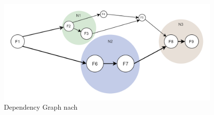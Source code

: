 \documentclass[11pt]{article}
\begin{document}
\begin{figure}[H]
\caption{Dependency Graph nach \cite{shafiei2020serverless}}
\label{fig:dependencyGraph}
\centering
\includegraphics[width=1\textwidth]{DependencyGraph}
\end{figure}
\end{document}
